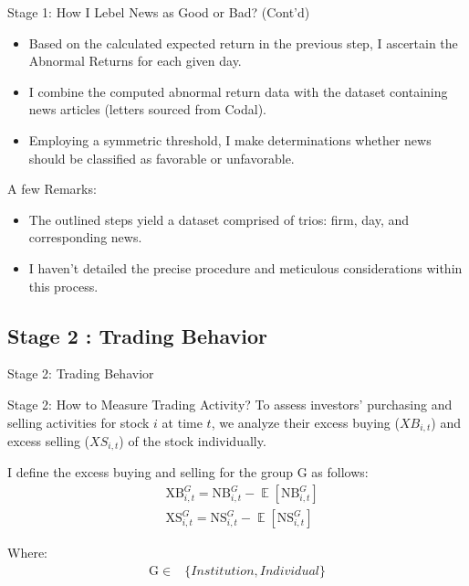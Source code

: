 \documentclass{beamer}
\DeclareMathOperator{\E}{\mathbb{E}} %
\begin{document}
\begin{frame}{Stage 1: How I Lebel News as Good or Bad? (Cont'd)}
    \begin{itemize}
        \item Based on the calculated expected return in the previous step, I ascertain the Abnormal Returns for each given day.
        \item I combine the computed abnormal return data with the dataset containing news articles (letters sourced from Codal).
        \item Employing a symmetric threshold, I make determinations whether news should be classified as favorable or unfavorable.
    \end{itemize}

    A few Remarks:
    \begin{itemize}
        \item The outlined steps yield a dataset comprised of trios: firm, day, and corresponding news.
        \item I haven't detailed the precise procedure and meticulous considerations within this process.
    \end{itemize}

\end{frame}


\subsection{Stage 2 : Trading Behavior}



\begin{frame}
    \Huge
    \center
    Stage 2: Trading Behavior
\end{frame}







\begin{frame}{Stage 2: How to Measure Trading Activity?}
    To assess investors' purchasing and selling activities for stock \(i\) at time \(t\), we analyze their excess buying (\(XB_{i,t}\)) and excess selling (\(XS_{i,t}\)) of the stock individually.
    \\
    \par
    I define the excess buying and selling for the group \(\mathrm{G}\) as follows:
    \[
        \begin{aligned}
             & \mathrm{XB}_{i, t}^G=\mathrm{NB}_{i, t}^G - \E\left[\mathrm{NB}_{i, t}^G\right] \\
             & \mathrm{XS}_{i, t}^G=\mathrm{NS}_{i, t}^G - \E\left[\mathrm{NS}_{i, t}^G\right]
        \end{aligned}
    \]

    Where:
    \[
        \begin{aligned}
            \mathrm{G}                     \in & \{Institution, Individual\} \\
        \end{aligned}
    \]

\end{frame}
\end{document}

